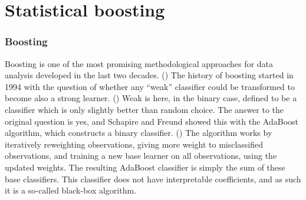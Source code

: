 \chapter{Statistical boosting}
\subsection{Boosting}
Boosting is one of the most promising methodological approaches for data analysis developed in the last two decades. (\cite{mayr14a}) The history of boosting started in 1994 with the question of whether any ``weak'' classifier could be transformed to become also a strong learner. (\cite{kearns}) Weak is here, in the binary case, defined to be a classifier which is only slightly better than random choice. The answer to the original question is yes, and Schapire and Freund showed this with the AdaBoost algorithm, which constructs a binary classifier. (\cite{adaboost}) The algorithm works by iteratively reweighting observations, giving more weight to misclassified observations, and training a new base learner on all observations, using the updated weights. The resulting AdaBoost classifier is simply the sum of these base classifiers. This classifier does not have interpretable coefficients, and as such it is a so-called black-box algorithm.

